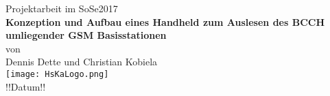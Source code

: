 %
%
\begin{titlepage}
\begin{center}
         {\large \hspace{13mm} Projektarbeit im SoSe2017\\}
  \vspace{10mm}
         {\Large
          \hspace{20mm}\textbf{Konzeption und Aufbau eines Handheld zum Auslesen des BCCH umliegender GSM Basisstationen }\\}
  \vspace{10mm}
         {\large \hspace{20mm}von}\\
         {\large \hspace{20mm}Dennis Dette und Christian Kobiela}\\
  \vfill
  \vspace{5mm}
                 \hspace{20mm} \texttt{[image: HsKaLogo.png]}\\
  \vspace{5mm}
  \vspace{10mm}
         {\large \hspace{20mm}!!Datum!!}
\end{center}
\end{titlepage}

\clearpage
\thispagestyle{empty}
\cleardoublepage
